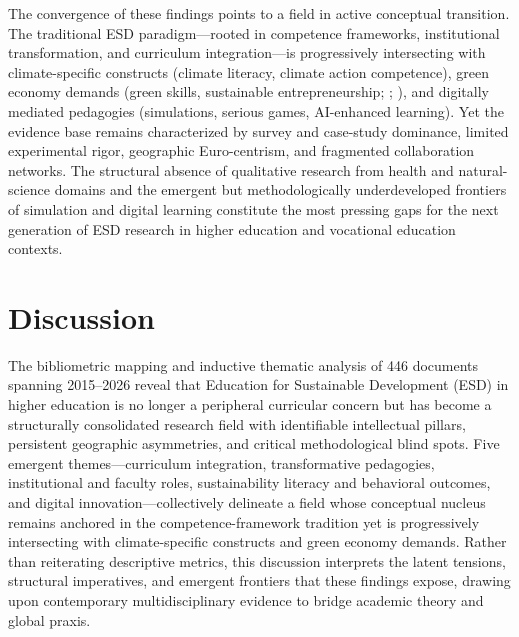 \documentclass[pdflatex,sn-basic]{sn-jnl}%
\begin{document}
The convergence of these findings points to a field in active conceptual transition. The traditional ESD paradigm---rooted in competence frameworks, institutional transformation, and curriculum integration---is progressively intersecting with climate-specific constructs (climate literacy, climate action competence), green economy demands (green skills, sustainable entrepreneurship; \cite{garcia-hernandez_structural_2025}; \cite{carstensen_mapping_2025}), and digitally mediated pedagogies (simulations, serious games, AI-enhanced learning). Yet the evidence base remains characterized by survey and case-study dominance, limited experimental rigor, geographic Euro-centrism, and fragmented collaboration networks. The structural absence of qualitative research from health and natural-science domains and the emergent but methodologically underdeveloped frontiers of simulation and digital learning constitute the most pressing gaps for the next generation of ESD research in higher education and vocational education contexts.


\section{Discussion}
\label{sec:discusion}

The bibliometric mapping and inductive thematic analysis of 446 documents spanning 2015--2026 reveal that Education for Sustainable Development (ESD) in higher education is no longer a peripheral curricular concern but has become a structurally consolidated research field with identifiable intellectual pillars, persistent geographic asymmetries, and critical methodological blind spots. Five emergent themes---curriculum integration, transformative pedagogies, institutional and faculty roles, sustainability literacy and behavioral outcomes, and digital innovation---collectively delineate a field whose conceptual nucleus remains anchored in the competence-framework tradition \cite{wiek_operationalising_2015} yet is progressively intersecting with climate-specific constructs and green economy demands. Rather than reiterating descriptive metrics, this discussion interprets the latent tensions, structural imperatives, and emergent frontiers that these findings expose, drawing upon contemporary multidisciplinary evidence to bridge academic theory and global praxis.
\end{document}

